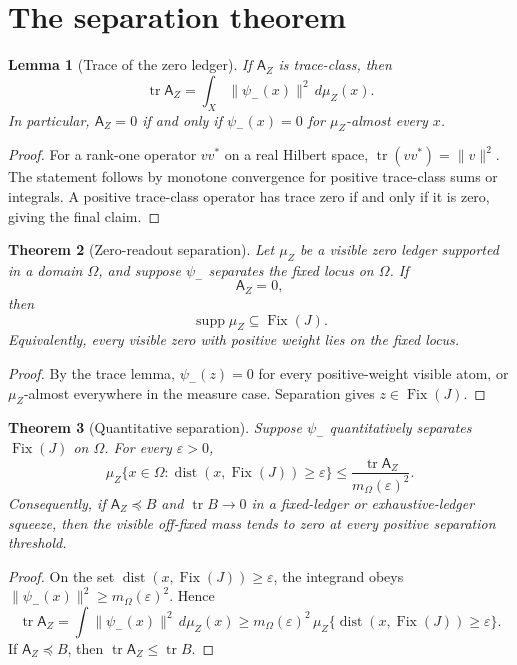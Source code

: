 \documentclass[11pt]{article}
\newtheorem{theorem}{Theorem}[section]
\newtheorem{lemma}[theorem]{Lemma}
\newcommand{\FixSetx}{\operatorname{Fix}}
\newcommand{\Tr}{\operatorname{tr}}
\newcommand{\dist}{\operatorname{dist}}
\newcommand{\Supp}{\operatorname{supp}}
\begin{document}
\section{The separation theorem}
\begin{lemma}[Trace of the zero ledger]
If $\mathsf A_Z$ is trace-class, then
\[
  \Tr \mathsf A_Z=\int_X \|\psi_-(x)\|^2\,d\mu_Z(x).
\]
In particular, $\mathsf A_Z=0$ if and only if $\psi_-(x)=0$ for $\mu_Z$-almost every $x$.
\end{lemma}

\begin{proof}
For a rank-one operator $vv^*$ on a real Hilbert space, $\Tr(vv^*)=\|v\|^2$.  The statement follows by monotone convergence for positive trace-class sums or integrals.  A positive trace-class operator has trace zero if and only if it is zero, giving the final claim.
\end{proof}

\begin{theorem}[Zero-readout separation]
Let $\mu_Z$ be a visible zero ledger supported in a domain $\Omega$, and suppose $\psi_-$ separates the fixed locus on $\Omega$.  If
\[
  \mathsf A_Z=0,
\]
then
\[
  \Supp\mu_Z\subseteq \FixSetx(J).
\]
Equivalently, every visible zero with positive weight lies on the fixed locus.
\end{theorem}

\begin{proof}
By the trace lemma, $\psi_-(z)=0$ for every positive-weight visible atom, or $\mu_Z$-almost everywhere in the measure case.  Separation gives $z\in\FixSetx(J)$.
\end{proof}

\begin{theorem}[Quantitative separation]
Suppose $\psi_-$ quantitatively separates $\FixSetx(J)$ on $\Omega$.  For every $\varepsilon>0$,
\[
  \mu_Z\{x\in\Omega:\dist(x,\FixSetx(J))\ge\varepsilon\}
  \le
  \frac{\Tr\mathsf A_Z}{m_\Omega(\varepsilon)^2}.
\]
Consequently, if $\mathsf A_Z\preceq B$ and $\Tr B\to0$ in a fixed-ledger or exhaustive-ledger squeeze, then the visible off-fixed mass tends to zero at every positive separation threshold.
\end{theorem}

\begin{proof}
On the set $\dist(x,\FixSetx(J))\ge\varepsilon$, the integrand obeys $\|\psi_-(x)\|^2\ge m_\Omega(\varepsilon)^2$.  Hence
\[
  \Tr\mathsf A_Z
  =\int \|\psi_-(x)\|^2\,d\mu_Z(x)
  \ge m_\Omega(\varepsilon)^2\,\mu_Z\{\dist(x,\FixSetx(J))\ge\varepsilon\}.
\]
If $\mathsf A_Z\preceq B$, then $\Tr\mathsf A_Z\le\Tr B$.
\end{proof}
\end{document}
